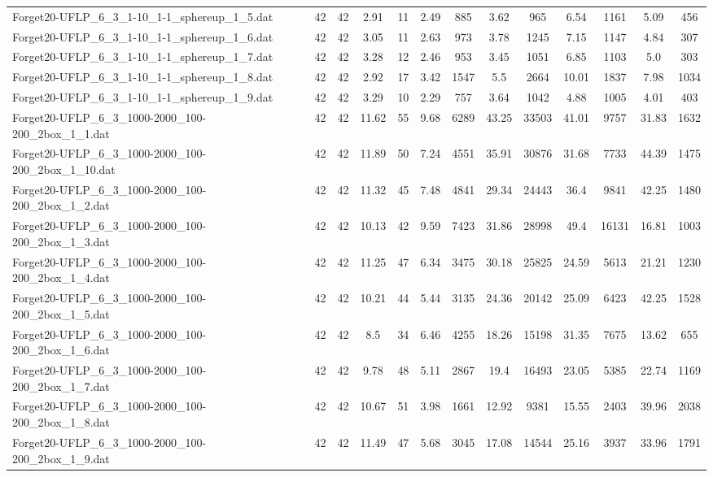 \begin{table}[!ht]
{\begin{tabular}{lcccccccccccc}
Forget20-UFLP\_6\_3\_1-10\_1-1\_sphereup\_1\_5.dat & 42 & 42 & 2.91 & 11 & 2.49 & 885 & 3.62 & 965 & 6.54 & 1161 & 5.09 & 456 \\
Forget20-UFLP\_6\_3\_1-10\_1-1\_sphereup\_1\_6.dat & 42 & 42 & 3.05 & 11 & 2.63 & 973 & 3.78 & 1245 & 7.15 & 1147 & 4.84 & 307 \\
Forget20-UFLP\_6\_3\_1-10\_1-1\_sphereup\_1\_7.dat & 42 & 42 & 3.28 & 12 & 2.46 & 953 & 3.45 & 1051 & 6.85 & 1103 & 5.0 & 303 \\
Forget20-UFLP\_6\_3\_1-10\_1-1\_sphereup\_1\_8.dat & 42 & 42 & 2.92 & 17 & 3.42 & 1547 & 5.5 & 2664 & 10.01 & 1837 & 7.98 & 1034 \\
Forget20-UFLP\_6\_3\_1-10\_1-1\_sphereup\_1\_9.dat & 42 & 42 & 3.29 & 10 & 2.29 & 757 & 3.64 & 1042 & 4.88 & 1005 & 4.01 & 403 \\
Forget20-UFLP\_6\_3\_1000-2000\_100-200\_2box\_1\_1.dat & 42 & 42 & 11.62 & 55 & 9.68 & 6289 & 43.25 & 33503 & 41.01 & 9757 & 31.83 & 1632 \\
Forget20-UFLP\_6\_3\_1000-2000\_100-200\_2box\_1\_10.dat & 42 & 42 & 11.89 & 50 & 7.24 & 4551 & 35.91 & 30876 & 31.68 & 7733 & 44.39 & 1475 \\
Forget20-UFLP\_6\_3\_1000-2000\_100-200\_2box\_1\_2.dat & 42 & 42 & 11.32 & 45 & 7.48 & 4841 & 29.34 & 24443 & 36.4 & 9841 & 42.25 & 1480 \\
Forget20-UFLP\_6\_3\_1000-2000\_100-200\_2box\_1\_3.dat & 42 & 42 & 10.13 & 42 & 9.59 & 7423 & 31.86 & 28998 & 49.4 & 16131 & 16.81 & 1003 \\
Forget20-UFLP\_6\_3\_1000-2000\_100-200\_2box\_1\_4.dat & 42 & 42 & 11.25 & 47 & 6.34 & 3475 & 30.18 & 25825 & 24.59 & 5613 & 21.21 & 1230 \\
Forget20-UFLP\_6\_3\_1000-2000\_100-200\_2box\_1\_5.dat & 42 & 42 & 10.21 & 44 & 5.44 & 3135 & 24.36 & 20142 & 25.09 & 6423 & 42.25 & 1528 \\
Forget20-UFLP\_6\_3\_1000-2000\_100-200\_2box\_1\_6.dat & 42 & 42 & 8.5 & 34 & 6.46 & 4255 & 18.26 & 15198 & 31.35 & 7675 & 13.62 & 655 \\
Forget20-UFLP\_6\_3\_1000-2000\_100-200\_2box\_1\_7.dat & 42 & 42 & 9.78 & 48 & 5.11 & 2867 & 19.4 & 16493 & 23.05 & 5385 & 22.74 & 1169 \\
Forget20-UFLP\_6\_3\_1000-2000\_100-200\_2box\_1\_8.dat & 42 & 42 & 10.67 & 51 & 3.98 & 1661 & 12.92 & 9381 & 15.55 & 2403 & 39.96 & 2038 \\
Forget20-UFLP\_6\_3\_1000-2000\_100-200\_2box\_1\_9.dat & 42 & 42 & 11.49 & 47 & 5.68 & 3045 & 17.08 & 14544 & 25.16 & 3937 & 33.96 & 1791 \\

\end{tabular}}
\end{table}
